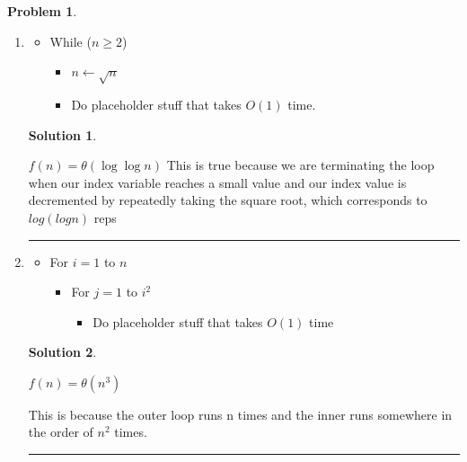 \documentclass{article}
\theoremstyle{definition}
\newtheorem{problem}{Problem}
\def\fline{\rule{0.75\linewidth}{0.5pt}}
\newcommand{\finishline}{
  \begin{center}\fline
\end{center}}
\newtheorem*{solution*}{Solution}
\newenvironment{solution}{
\begin{solution*}}{{\finishline}
\end{solution*}}
\begin{document}
\begin{problem}
\begin{enumerate}[label =\alph*)]
      \item
        \begin{itemize}
          \item While ($n \geq 2$)
            \begin{itemize}
              \item $n \gets \sqrt{n}$
              \item Do placeholder stuff that takes $O(1)$ time.
            \end{itemize}
        \end{itemize}

        \begin{solution}
          \

          $f(n) = \theta(\log\log n)$ This is true because we are terminating the loop when our index variable reaches a small value and our index value is decremented by repeatedly taking the square root, which corresponds to $log(log n)$ reps
        \end{solution}

      \item

        \begin{itemize}
          \item For $i = 1$ to $n$
            \begin{itemize}
              \item For $j = 1$ to $i^2$
                \begin{itemize}
                  \item Do placeholder stuff that takes $O(1)$ time
                \end{itemize}
            \end{itemize}
        \end{itemize}
        \begin{solution}
          \

          $f(n) = \theta(n^3)$
          
          This is because the outer loop runs n times and the inner runs somewhere in the order of $n^2$ times.
        \end{solution}


\end{enumerate}
\end{problem}
\end{document}
